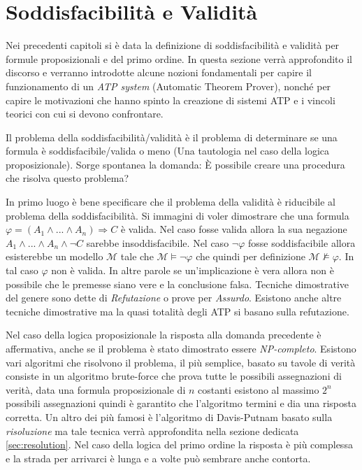 \documentclass[./main.tex]{subfiles}
\begin{document}


\section{Soddisfacibilità e Validità} \label{sec:sat_val}
Nei precedenti capitoli si è data la definizione di soddisfacibilità e validità per formule proposizionali e del primo ordine.
In questa sezione verrà approfondito il discorso e verranno introdotte alcune nozioni fondamentali per 
capire il funzionamento di un \textit{ATP system} (Automatic Theorem Prover), nonché 
per capire le motivazioni che hanno spinto la creazione di sistemi ATP e i vincoli teorici con cui si devono confrontare.


Il problema della soddisfacibilità/validità è il problema di determinare 
se una formula è soddisfacibile/valida o meno (Una tautologia nel caso della logica proposizionale).
Sorge spontanea la domanda: È possibile creare una procedura che risolva questo problema?

In primo luogo è bene specificare che il problema della validità è riducibile al problema della soddisfacibilità.
Si immagini di voler dimostrare che una formula $\varphi = (A_1 \land ... \land A_n) \Rightarrow C$ è valida.
Nel caso fosse valida allora la sua negazione $A_1 \land ... \land A_n \land \lnot C$ sarebbe insoddisfacibile.
Nel caso $\lnot \varphi$ fosse soddisfacibile allora esisterebbe
 un modello $\mathcal{M}$ tale che $\mathcal{M} \models \lnot \varphi$ che quindi per definizione 
$\mathcal{M} \not\models \varphi$. In tal caso $\varphi$ non è valida.
In altre parole se un'implicazione è vera allora non è possibile che le premesse siano vere e la conclusione falsa.
Tecniche dimostrative del genere sono dette di \textit{Refutazione} o prove per \textit{Assurdo}.
Esistono anche altre tecniche dimostrative ma la quasi totalità degli ATP si basano sulla refutazione.


Nel caso della logica proposizionale la risposta alla domanda precedente è affermativa, 
anche se il problema è stato dimostrato essere \textit{NP-completo}. 
Esistono vari algoritmi che risolvono il problema,
il più semplice, basato su tavole di verità consiste in un algoritmo 
brute-force che prova tutte le possibili assegnazioni di verità,  
data una formula proposizionale di $n$ costanti esistono al massimo $2^n$ possibili assegnazioni 
quindi è garantito che l'algoritmo termini e dia una risposta corretta.
Un altro dei più famosi è l'algoritmo di Davis-Putnam basato sulla \textit{risoluzione} ma 
tale tecnica verrà approfondita nella sezione dedicata \ref{sec:resolution}.
Nel caso della logica del primo ordine la risposta è più complessa e la strada per arrivarci è lunga e a volte può sembrare anche contorta.
\end{document}
